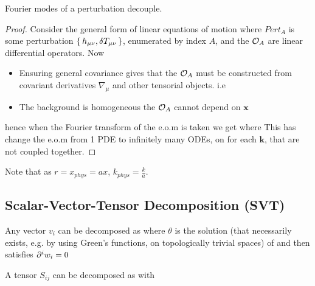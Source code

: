\documentclass{article}
\begin{document}
\begin{prop}
Fourier modes of a perturbation decouple. 
\end{prop}
\begin{proof}
Consider the general form of linear equations of motion
where $Pert_A$ is some perturbation $\set{h_{\mu\nu},\delta T_{\mu\nu}}$, enumerated by index $A$, and the $\mathcal{O}_A$ are linear differential operators.
Now 
\begin{itemize}
    \item Ensuring general covariance gives that the $\mathcal{O}_A$ must be constructed from covariant derivatives $\nabla_\mu$ and other tensorial objects. i.e 
    \item The background is homogeneous the $\mathcal{O}_A$ cannot depend on $\bm{x}$
\end{itemize}
hence when the Fourier transform of the e.o.m is taken we get 
where 
This has change the e.o.m from 1 PDE to infinitely many ODEs, on for each $\bm{k}$, that are not coupled together. 
\end{proof}

Note that as $r = x_{phys} = a x$,  $k_{phys} = \frac{k}{a}$. 



\subsection{Scalar-Vector-Tensor Decomposition (SVT)}

\begin{definition}
Any vector $v_i$ can be decomposed as 
where $\theta$ is the solution (that necessarily exists, e.g. by using Green's functions, on topologically trivial spaces) of 
and then 
satisfies $\partial^i w_i = 0$
\end{definition}

\begin{definition}
A tensor $S_{ij}$ can be decomposed as 
with 
\end{definition}
\end{document}
